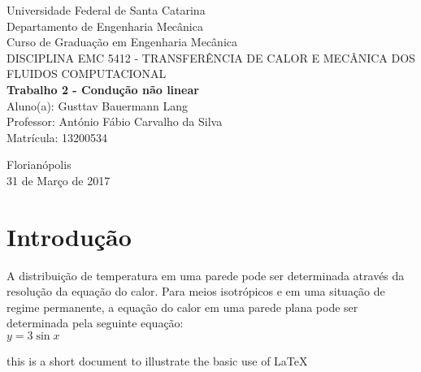 \documentclass{article}
\begin{document}
\begin{spacing}{1.5}

\begin{titlepage} %
\begin{center} %
{\large Universidade Federal de Santa Catarina}\\[0.2cm] %
{\large Departamento de Engenharia Mec\^anica}\\[0.2cm]
{\large Curso de Gradua\c{c}\~ao em Engenharia Mec\^anica}\\[0.2cm]
{\large  DISCIPLINA EMC 5412 - TRANSFER\^ENCIA DE CALOR E MEC\^ANICA DOS FLUIDOS COMPUTACIONAL}\\[7.6cm]
{\bf \huge Trabalho 2 - Condu\c{c}\~ao n\~ao linear}\\[5.3cm] %

{\large Aluno(a): Gusttav Bauermann Lang}\\[0.4cm] %
{\large Professor: Ant\'onio F\'abio Carvalho da Silva}\\[0.4cm]
{\large Matr\'icula: 13200534}
\end{center} %

\vspace{\fill}
\begin{center}
{\large Florian\'opolis}\\[0.1cm]
{\large 31 de Mar\c{c}o de 2017}
\end{center}
\end{titlepage} %

\section{Introdu\c{c}\~ao}

A distribuição de temperatura em uma parede pode ser determinada através da resolução da equação do calor. Para meios isotrópicos e em uma situação de regime permanente, a equação do calor em uma parede plana pode ser determinada pela seguinte equação:
\\
$y=3\sin x$

\end{spacing}




this is a short document to illustrate the basic use of \LaTeX
\end{document}
